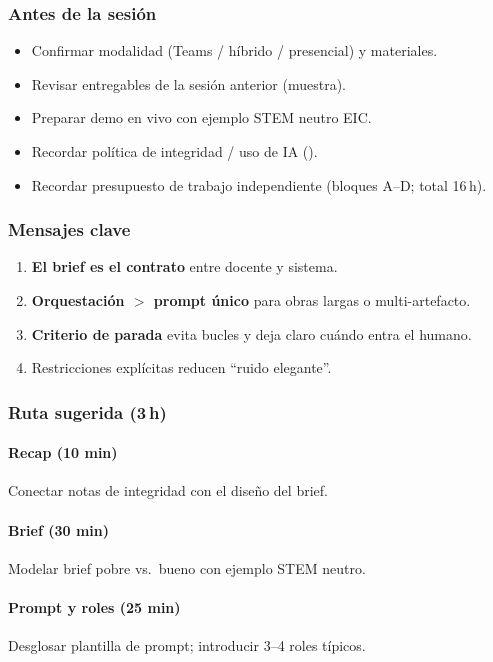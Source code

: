 \subsubsection*{Antes de la sesión}
\begin{itemize}
\item[$\square$] Confirmar modalidad (Teams / híbrido / presencial) y materiales.
\item[$\square$] Revisar entregables de la sesión anterior (muestra).
\item[$\square$] Preparar demo en vivo con ejemplo STEM neutro EIC.
\item[$\square$] Recordar política de integridad / uso de IA (\ceddie).
\item[$\square$] Recordar presupuesto de trabajo independiente (bloques A--D; total 16\,h).
\end{itemize}

\subsubsection*{Mensajes clave}
\begin{enumerate}
\item \textbf{El brief es el contrato} entre docente y sistema.
\item \textbf{Orquestación $>$ prompt único} para obras largas o multi-artefacto.
\item \textbf{Criterio de parada} evita bucles y deja claro cuándo entra el humano.
\item Restricciones explícitas reducen ``ruido elegante''.
\end{enumerate}

\subsubsection*{Ruta sugerida (3\,h)}
\paragraph{Recap (10 min)} Conectar notas de integridad con el diseño del brief.
\paragraph{Brief (30 min)} Modelar brief pobre vs.\ bueno con ejemplo STEM neutro.
\paragraph{Prompt y roles (25 min)} Desglosar plantilla de prompt; introducir 3--4 roles típicos.
